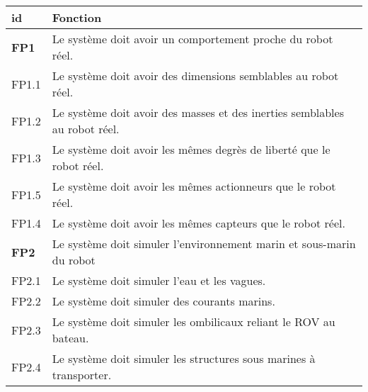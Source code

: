         \begin{table}[!htb]
            \centering
            \begin{adjustbox}{max width=\textwidth}
                \begin{tabularx}{\textwidth}{|lX|}
                    \hline
                    \cellcolor{gray!25}\textbf{id} & \cellcolor{gray!25} \textbf{Fonction} \\
                    \hline \hline
                    \cellcolor{blue!30}\textbf{FP1}&\cellcolor{blue!25} Le système doit avoir un comportement proche du robot réel. \\
                    \hline
                    \cellcolor{gray!10}FP1.1& Le système doit avoir des dimensions semblables au robot réel. \\
                    \hline
                    \cellcolor{gray!10}FP1.2& Le système doit avoir des masses et des inerties semblables au robot réel. \\
                    \hline
                    \cellcolor{gray!10}FP1.3& Le système doit avoir les mêmes degrès de liberté que le robot réel. \\
                    \hline
                    \cellcolor{gray!10}FP1.5& Le système doit avoir les mêmes actionneurs que le robot réel. \\
                    \hline
                    \cellcolor{gray!10}FP1.4& Le système doit avoir les mêmes capteurs que le robot réel. \\
            
                    \hline \hline
            
                    \cellcolor{blue!30}\textbf{FP2}&\cellcolor{blue!25} Le système doit simuler l'environnement marin et sous-marin du robot \\
                    \hline
                    \cellcolor{gray!10}FP2.1& Le système doit simuler l'eau et les vagues. \\
                    \hline
                    \cellcolor{gray!10}FP2.2& Le système doit simuler des courants marins. \\
                    \hline
                    \cellcolor{gray!10}FP2.3& Le système doit simuler les ombilicaux reliant le \gls{ROV} au bateau. \\
                    \hline
                    \cellcolor{gray!10}FP2.4& Le système doit simuler les structures sous marines à transporter. \\
                    \hline
            

\end{tabularx}
\end{adjustbox}
\end{table}
